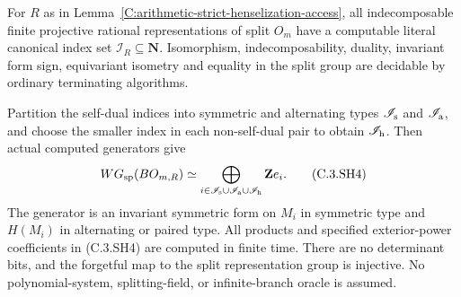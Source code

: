\begin{theorem}
\label{C:arithmetic-strict-henselization-WG}
For $R$ as in
Lemma~\ref{C:arithmetic-strict-henselization-access},
all indecomposable finite projective rational
representations of split $O_m$ have a computable
literal canonical index set $\mathscr I_R\subseteq\mathbf N$.
Isomorphism, indecomposability, duality, invariant
form sign, equivariant isometry and equality in
the split group are decidable by ordinary
terminating algorithms.

Partition the self-dual indices into symmetric
and alternating types $\mathscr I_{\rm s}$ and
$\mathscr I_{\rm a}$, and choose the smaller
index in each non-self-dual pair to obtain
$\mathscr I_{\rm h}$.
Then actual computed generators give
\[
 WG_{\rm sp}(BO_{m,R})\simeq
       \bigoplus_{i\in\mathscr I_{\rm s}\cup
                         \mathscr I_{\rm a}\cup
                         \mathscr I_{\rm h}}\mathbf Z e_i.         \tag{C.3.SH4}
\]
The generator is an invariant symmetric form on
$M_i$ in symmetric type and $H(M_i)$ in alternating
or paired type.  All products and specified
exterior-power coefficients in (C.3.SH4) are
computed in finite time.
There are no determinant bits, and the forgetful
map to the split representation group is injective.
No polynomial-system, splitting-field, or
infinite-branch oracle is assumed.
\end{theorem}
